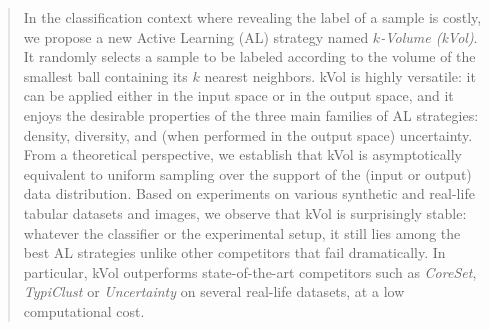 \documentclass[twoside]{article}
\theoremstyle{definition}
\theoremstyle{remark}
\begin{document}
\begin{abstract}
% 
%
%

In the classification context where revealing the label of a sample is costly, we propose a new  %
Active Learning (AL) strategy named \emph{$k$-Volume (kVol)}. %
It randomly
selects a sample to be labeled according to the volume
of the smallest ball containing its $k$ nearest neighbors. 
%
kVol is highly versatile: it can be applied either in the input space or in the output space, and it enjoys the desirable properties of the three main families of AL strategies: density, diversity, and (when performed in the output space) uncertainty. 
%
From a theoretical perspective, we establish that kVol is asymptotically equivalent to uniform sampling over the support of the (input or output) data distribution.
%
%
%
%
%
Based on experiments on various synthetic and real-life tabular datasets and images, 
we observe that 
kVol is surprisingly stable: whatever the classifier or the experimental setup, it still lies among the best AL strategies unlike other competitors that fail dramatically. 
In particular, kVol outperforms state-of-the-art competitors such as \emph{CoreSet}, \emph{TypiClust} or \emph{Uncertainty} on several real-life datasets, at a low computational cost.


%
%
%
\end{abstract}
\end{document}
